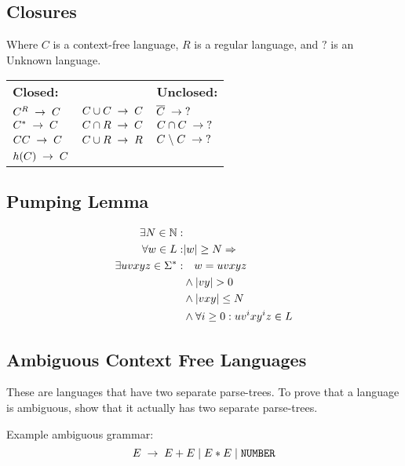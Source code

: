 \subsection{Closures}
Where $C$ is a context-free language, $R$ is a regular language, and $?$ is
an Unknown language.

\settowidth{\templength}{$C \cup C \spto C$}
\addtolength{\templength}{1cm}
\begin{tabular}{lp{\templength}l}
\textbf{Closed:} & & \textbf{Unclosed:} \\
$C^R \;\to\; C$ & $C \cup C \spto C$ & $\overline{C} \;\to\; ?$\\
$C^* \;\to\; C$ & $C \cap R \;\to\; C$ & $C \cap C \;\to\; ?$\\
$CC \;\to\; C$  & $C \cup R \;\to\; R$ & $C \;\backslash\; C \;\to\; ?$\\
$h(C) \;\to\; C$ & & \\
\end{tabular}

\subsection{Pumping Lemma}
\begin{align*}
  \exists N \in \mathbb{N}: & \\
          \forall w \in L : & |w| \geq N \Rightarrow \\
\exists uvxyz \in \Sigma^*: & \quad w = uvxyz \\
                            & \land |vy| > 0 \\
                            & \land |vxy| \leq N \\
                            & \land \forall i \geq 0: uv^ixy^iz \in L
\end{align*}

\subsection{Ambiguous Context Free Languages}
These are languages that have two separate parse-trees. To prove
that a language is ambiguous, show that it actually has two separate
parse-trees.

Example ambiguous grammar:
\[
    E \;\to\; E + E \;|\; E * E \;|\; \texttt{NUMBER}
\]

